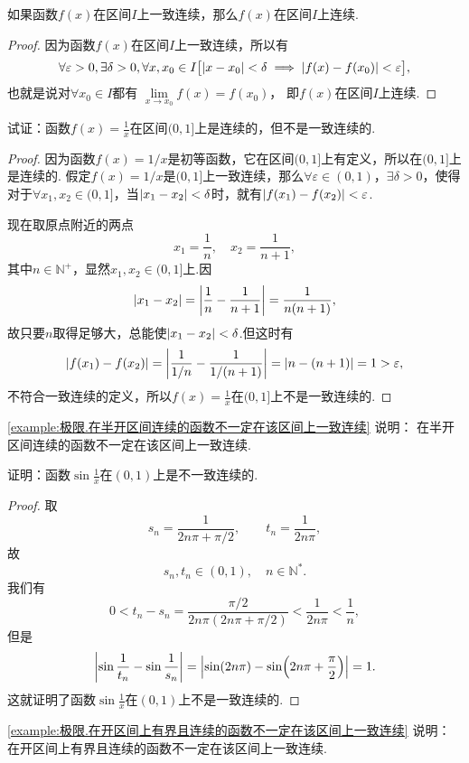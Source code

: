 \begin{theorem}\label{theorem:极限.闭区间上连续函数的性质.一致连续函数一定连续}
如果函数\(f(x)\)在区间\(I\)上一致连续，那么\(f(x)\)在区间\(I\)上连续.
\begin{proof}
因为函数\(f(x)\)在区间\(I\)上一致连续，所以有
\[
\forall \varepsilon > 0,
\exists \delta > 0,
\forall x,x_0 \in I
\bigl[
	 \abs{x-x_0} < \delta
	 \implies
	 \abs{f(x)-f(x_0)} < \varepsilon
\bigr],
\]
也就是说对\(\forall x_0 \in I\)都有%
\(\lim\limits_{x \to x_0} f(x) = f(x_0)\)，%
即\(f(x)\)在区间\(I\)上连续.
\end{proof}
\end{theorem}

\begin{example}\label{example:极限.在半开区间连续的函数不一定在该区间上一致连续}
试证：函数\(f(x) = \frac{1}{x}\)在区间\((0,1]\)上是连续的，但不是一致连续的.
\begin{proof}
因为函数\(f(x) = 1/x\)是初等函数，它在区间\((0,1]\)上有定义，所以在\((0,1]\)上是连续的.
假定\(f(x) = 1/x\)是\((0,1]\)上一致连续，那么\(\forall \varepsilon \in (0,1)\)，\(\exists \delta > 0\)，使得对于\(\forall x_1,x_2 \in (0,1]\)，当\(\abs{x_1 - x_2} < \delta\)时，就有\(\abs{f(x_1) - f(x_2)} < \varepsilon\).

现在取原点附近的两点\[
x_1 = \frac{1}{n}, \quad x_2 = \frac{1}{n+1},
\]其中\(n\in\mathbb{N}^+\)，显然\(x_1,x_2 \in (0,1]\)上.因\[
\abs{x_1 - x_2} = \abs{\frac{1}{n} - \frac{1}{n+1}}
= \frac{1}{n(n+1)},
\]故只要\(n\)取得足够大，总能使\(\abs{x_1 - x_2} < \delta\).但这时有\[
\abs{f(x_1) - f(x_2)}
= \abs{\frac{1}{1/n} - \frac{1}{1/(n+1)}}
= \abs{n - (n+1)}
= 1 > \varepsilon,
\]不符合一致连续的定义，所以\(f(x) = \frac{1}{x}\)在\((0,1]\)上不是一致连续的.
\end{proof}
\end{example}
\cref{example:极限.在半开区间连续的函数不一定在该区间上一致连续} 说明：
在半开区间连续的函数不一定在该区间上一致连续.

\begin{example}\label{example:极限.在开区间上有界且连续的函数不一定在该区间上一致连续}
证明：函数\(\sin\frac{1}{x}\)在\((0,1)\)上是不一致连续的.
\begin{proof}
取\[
s_n = \frac{1}{2n\pi+\pi/2},
\qquad
t_n = \frac{1}{2n\pi},
\]故\[
s_n,t_n\in(0,1),
\quad n\in\mathbb{N}^*.
\]我们有\[
0 < t_n - s_n = \frac{\pi/2}{2n\pi(2n\pi+\pi/2)} < \frac{1}{2n\pi} < \frac{1}{n},
\]但是\[
\abs{\sin\frac{1}{t_n} - \sin\frac{1}{s_n}}
= \abs{\sin(2n\pi) - \sin(2n\pi+\frac{\pi}{2})}
= 1.
\]这就证明了函数\(\sin\frac{1}{x}\)在\((0,1)\)上不是一致连续的.
\end{proof}
\end{example}
\cref{example:极限.在开区间上有界且连续的函数不一定在该区间上一致连续} 说明：
在开区间上有界且连续的函数不一定在该区间上一致连续.

